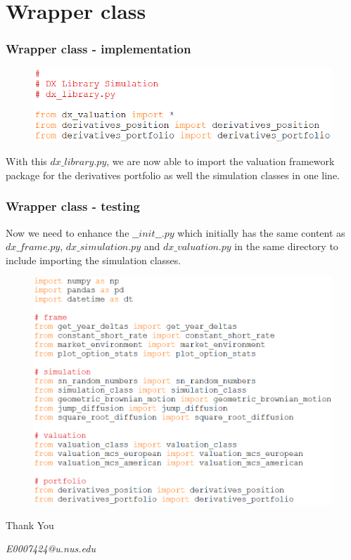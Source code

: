 \documentclass{beamer}
\begin{document}
\section{Wrapper class}
\begin{frame}
\frametitle{Wrapper class - implementation}
\begin{figure}[H]
	\includegraphics[scale=0.48]{wrapper_class.png}
\end{figure}
With this $dx\_library.py$, we are now able to import the valuation framework package for the derivatives portfolio as well the simulation classes in one line.
\end{frame}

\begin{frame}
\frametitle{Wrapper class - testing}
Now we need to enhance the $\_\_init\_\_.py$ which initially has the same content as $dx\_frame.py$,  $dx\_simulation.py$ and $dx\_valuation.py$ in the same directory to include importing the simulation classes.
\begin{figure}[H]
	\includegraphics[scale=0.35]{overall_wrapper_class.png}
\end{figure}
\end{frame}

\begin{frame}
\Huge{\centerline{Thank You}}
\begin{center}
\begin{normalsize}
\emph{E0007424@u.nus.edu}
\end{normalsize}
\end{center}
\end{frame}

\end{document}
